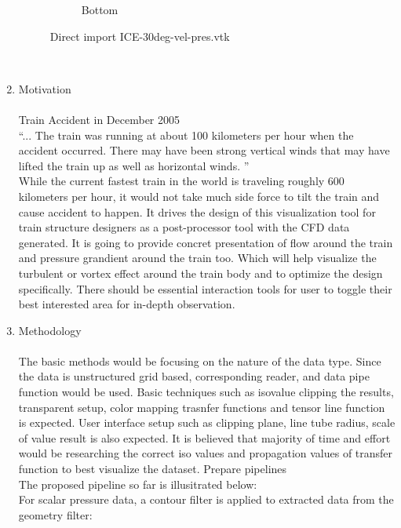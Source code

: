 \documentclass[
	12pt, %
]{fphw}
\begin{document}
\begin{enumerate}[(\itshape 1\normalfont)]
\begin{figure}[h]
\begin{subfigure}[h]{0.2\textwidth}
        \caption{Bottom}
        \label{fig:1c2}
    \end{subfigure}
    \caption{Direct import ICE-30deg-vel-pres.vtk}\label{fig:1c}
\end{figure}\\
\item Motivation\\\\
Train Accident in December 2005\\
“... The train was running at about 100 kilometers per hour when the accident occurred. There may have been strong vertical winds that may have lifted the train up as well as horizontal winds. ”\\
While the current fastest train in the world is traveling roughly 600 kilometers per hour, it would not take much side force to tilt the train and cause accident to happen. It drives the design of this visualization tool for train structure designers as a post-processor tool with the CFD data generated. It is going to provide concret presentation of flow around the train and pressure grandient around the train too. Which will help visualize the turbulent or vortex effect around the train body and to optimize the design specifically. There should be essential interaction tools for user to toggle their best interested area for in-depth observation.\\
\item Methodology\\\\
The basic methods would be focusing on the nature of the data type. Since the data is unstructured grid based, corresponding reader, and data pipe function would be used. Basic techniques such as isovalue clipping the results, transparent setup, color mapping trasnfer functions and tensor line function is expected. User interface setup such as clipping plane, line tube radius, scale of value result is also expected. It is believed that majority of time and effort would be researching the correct iso values and propagation values of transfer function to best visualize the dataset. Prepare pipelines\\
The proposed pipeline so far is illusitrated below:\\
For scalar pressure data, a contour filter is applied to extracted data from the geometry filter:
\begin{figure}[h]
    \centering
    \begin{subfigure}[h]{0.5\textwidth}

\end{subfigure}
\end{figure}
\end{enumerate}
\end{document}
